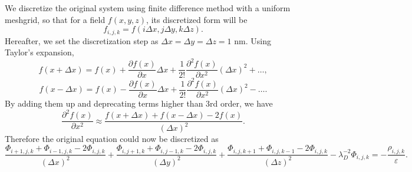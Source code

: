 \documentclass{article}
\begin{document}
\begin{spacing}{1.1}
We discretize the original system using finite difference method with a uniform meshgrid, so that for a field $f(x,y,z)$, its discretized form will be
\[f_{i,j,k}=f(i\Delta x, j\Delta y, k\Delta z).\]
Hereafter, we set the discretization step as $\Delta x = \Delta y = \Delta z = 1$ nm.
Using Taylor's expansion,
\[f(x+\Delta x) = f(x)+\frac{\partial f(x)}{\partial x}\Delta x+\frac{1}{2!}\frac{\partial ^2 f(x)}{\partial x^2} (\Delta x)^2+\dots ,\]
\[f(x-\Delta x) = f(x)-\frac{\partial f(x)}{\partial x}\Delta x+\frac{1}{2!}\frac{\partial ^2 f(x)}{\partial x^2} (\Delta x)^2-\dots .\]
By adding them up and deprecating terms higher than 3rd order, we have
\[\frac{\partial^2 f(x)}{\partial x^2}\approx\frac{f(x+\Delta x)+f(x-\Delta x)-2f(x)}{(\Delta x)^2}.\]
Therefore the original equation could now be discretized as
\[\frac{\Phi_{i+1,j,k}+\Phi_{i-1,j,k}-2\Phi_{i,j,k}}{(\Delta x)^2}+
\frac{\Phi_{i,j+1,k}+\Phi_{i,j-1,k}-2\Phi_{i,j,k}}{(\Delta y)^2}+
\frac{\Phi_{i,j,k+1}+\Phi_{i,j,k-1}-2\Phi_{i,j,k}}{(\Delta z)^2}-
\lambda_D^{-2}\Phi_{i,j,k}
=-\frac{\rho_{i,j,k}}{\varepsilon}.\]


\end{spacing}
\end{document}
